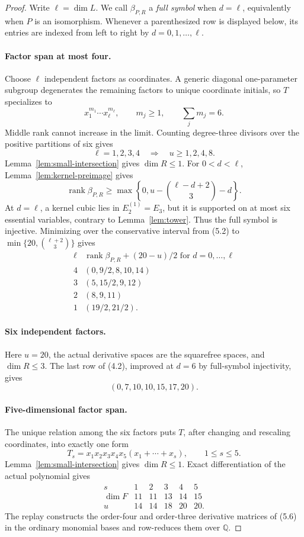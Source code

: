 \documentclass[11pt]{amsart}
\newcommand{\rank}{\operatorname{rank}}
\theoremstyle{definition}
\begin{document}
\begin{proof}
Write \(\ell=\dim L\).
We call \(\beta_{P,R}\) a \emph{full symbol} when \(d=\ell\), equivalently
when \(P\) is an isomorphism. Whenever a parenthesized row is displayed below,
its entries are indexed from left to right by \(d=0,1,\ldots,\ell\).

\paragraph{Factor span at most four.}
Choose \(\ell\) independent factors as coordinates. A generic diagonal
one-parameter subgroup degenerates the remaining factors to unique coordinate
initials, so \(T\) specializes to
\[
 x_1^{m_1}\cdots x_\ell^{m_\ell},\qquad m_j\ge1,
 \qquad\sum_jm_j=6.
\]
Middle rank cannot increase in the limit. Counting degree-three divisors over
the positive partitions of six gives
\[
 \ell=1,2,3,4\quad\Longrightarrow\quad u\ge1,2,4,8. \tag{5.2}
\]
Lemma~\ref{lem:small-intersection} gives \(\dim R\le1\). For
\(0<d<\ell\), Lemma~\ref{lem:kernel-preimage} gives
\[
 \rank\beta_{P,R}\ge
 \max\left\{0,u-\binom{\ell-d+2}{3}-d\right\}. \tag{5.3}
\]
At \(d=\ell\), a kernel cubic lies in \(E_2^{(1)}=E_3\), but it is
supported on at most six essential variables, contrary to
Lemma~\ref{lem:tower}. Thus the full symbol is injective. Minimizing over the
conservative interval from (5.2) to
\(\min\{20,\binom{\ell+2}{3}\}\) gives
\[
\begin{array}{c|c}
\ell&\rank\beta_{P,R}+(20-u)/2\text{ for }d=0,\ldots,\ell\\ \hline
4&(0,9/2,8,10,14)\\
3&(5,15/2,9,12)\\
2&(8,9,11)\\
1&(19/2,21/2).
\end{array} \tag{5.4}
\]

\paragraph{Six independent factors.}
Here \(u=20\), the actual derivative spaces are the squarefree spaces, and
\(\dim R\le3\). The last row of (4.2), improved at \(d=6\) by full-symbol
injectivity, gives
\[
 (0,7,10,10,15,17,20). \tag{5.5}
\]

\paragraph{Five-dimensional factor span.}
The unique relation among the six factors puts \(T\), after changing and
rescaling coordinates, into exactly one form
\[
 T_s=x_1x_2x_3x_4x_5(x_1+\cdots+x_s),\qquad1\le s\le5. \tag{5.6}
\]
Lemma~\ref{lem:small-intersection} gives \(\dim R\le1\). Exact
differentiation of the actual polynomial gives
\[
\begin{array}{c|rrrrr}
s&1&2&3&4&5\\ \hline
\dim F&11&11&13&14&15\\
u&14&14&18&20&20.
\end{array} \tag{5.7}
\]
The replay constructs the order-four and order-three derivative matrices of
(5.6) in the ordinary monomial bases and row-reduces them over \(\mathbb Q\).


\end{proof}
\end{document}
